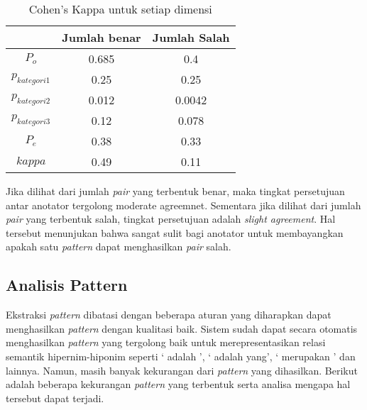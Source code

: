 \begin{table}
  \centering
  \caption{Cohen's Kappa untuk setiap dimensi}
  \label{table:p-kappa}
  \begin{tabular}{|c|c|c|}
  \hline
  & Jumlah benar & Jumlah Salah \\ \hline
  $P_o$ & 0.685 & 0.4 \\ \hline
  $p_{kategori1}$ & 0.25 & 0.25 \\ \hline
  $p_{kategori2}$ & 0.012 & 0.0042 \\ \hline
  $p_{kategori3}$ & 0.12 & 0.078 \\ \hline
  $P_e$ & 0.38 & 0.33 \\ \hline
  $kappa$ & 0.49 & 0.11 \\ \hline 
  \end{tabular} 
\end{table}

Jika dilihat dari jumlah \textit{pair} yang terbentuk benar, maka tingkat persetujuan antar anotator tergolong {moderate agreemnet}. Sementara jika dilihat dari jumlah \textit{pair} yang terbentuk salah, tingkat persetujuan adalah \textit{slight agreement}. Hal tersebut menunjukan bahwa sangat sulit bagi anotator untuk membayangkan apakah satu \textit{pattern} dapat menghasilkan \textit{pair} salah.

\subsection{Analisis Pattern}
Ekstraksi \textit{pattern} dibatasi dengan beberapa aturan yang diharapkan dapat menghasilkan \textit{pattern} dengan kualitasi baik. Sistem sudah dapat secara otomatis menghasilkan \textit{pattern} yang tergolong baik untuk merepresentasikan relasi semantik hipernim-hiponim seperti `{\tagHyponym} adalah {\tagHypernym}', `{\tagHyponym} adalah {\tagHypernym} yang', `{\tagHyponym} merupakan {\tagHypernym}' dan lainnya. Namun, masih banyak kekurangan dari \textit{pattern} yang dihasilkan. Berikut adalah beberapa kekurangan \textit{pattern} yang terbentuk serta analisa mengapa hal tersebut dapat terjadi.

